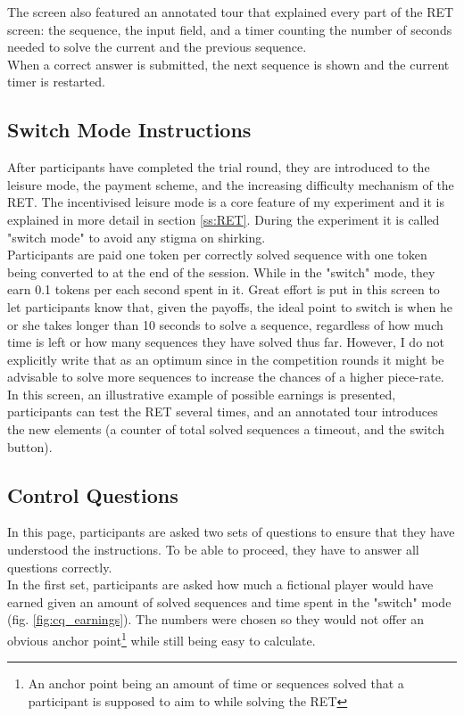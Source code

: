     The screen also featured an annotated tour that explained every part of the RET screen: the sequence, the input field, and a timer counting the number of seconds needed to solve the current and the previous sequence.\\
    
    When a correct answer is submitted, the next sequence is shown and the current timer is restarted.
    
    \subsection{Switch Mode Instructions}
    
    After participants have completed the trial round, they are introduced to the leisure mode, the payment scheme, and the increasing difficulty mechanism of the RET. The incentivised leisure mode is a core feature of my experiment and it is explained in more detail in section \ref{ss:RET}. During the experiment it is called "switch mode" to avoid any stigma on shirking.\\
    
    Participants are paid one token per correctly solved sequence with one token being converted to  at the end of the session. While in the "switch" mode, they earn 0.1 tokens per each second spent in it. Great effort is put in this screen to let participants know that, given the payoffs, the ideal point to switch is when he or she takes longer than 10 seconds to solve a sequence, regardless of how much time is left or how many sequences they have solved thus far. However, I do not explicitly write that as an optimum since in the competition rounds it might be advisable to solve more sequences to increase the chances of a higher piece-rate.\\
    
    In this screen, an illustrative example of possible earnings is presented, participants can test the RET several times, and an annotated tour introduces the new elements (a counter of total solved sequences a timeout, and the switch button).
    
    \subsection{Control Questions}
    
    In this page, participants are asked two sets of questions to ensure that they have understood the instructions. To be able to proceed, they have to answer all questions correctly.\\
    In the first set, participants are asked how much a fictional player would have earned given an amount of solved sequences and time spent in the "switch" mode (fig. \ref{fig:cq_earnings}). The numbers were chosen so they would not offer an obvious anchor point\footnote{An anchor point being an amount of time or sequences solved that a participant is supposed to aim to while solving the RET} while still being easy to calculate.
    
